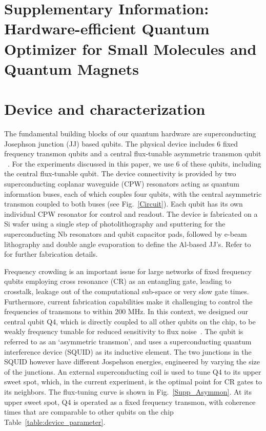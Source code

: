\documentclass[twocolumn]{revtex4-1}
\newcommand{\1}{\mathbbm{1}}
\newcommand{\beginsupplement}{%
        \setcounter{table}{0}
        \renewcommand{\thetable}{S\arabic{table}}%
        \setcounter{figure}{0}
        \renewcommand{\thefigure}{S\arabic{figure}}%
     }
\begin{document}
\pagebreak

\onecolumngrid




\section*{ Supplementary Information: Hardware-efficient Quantum Optimizer for Small Molecules and Quantum Magnets}
\beginsupplement





\section{Device and characterization}



The fundamental building blocks of our quantum hardware are superconducting Josephson junction (JJ) based qubits. The physical device includes 6 fixed frequency transmon qubits and a central flux-tunable asymmetric transmon qubit ~\cite{hutchings2017tunableS}. For the experiments discussed in this paper, we use 6 of these qubits, including the central flux-tunable qubit. The device connectivity is provided by two superconducting coplanar waveguide (CPW) resonators acting as quantum information buses, each of which couples four qubits, with the central asymmetric transmon coupled to both buses (see Fig.~\ref{Circuit}). Each qubit has its own individual CPW resonator for control and readout. The device is fabricated on a Si wafer using a single step of photolithography and sputtering for the superconducting Nb resonators and qubit capacitor pads, followed by e-beam lithography and double angle evaporation to define the Al-based JJ's. Refer to ~\cite{Chow2014S,Corcoles2015S} for further fabrication details.

Frequency crowding is an important issue for large networks of fixed frequency qubits employing cross resonance (CR) as an entangling gate, leading to crosstalk, leakage out of the computational sub-space or very slow gate times. Furthermore, current fabrication capabilities make it challenging to control the frequencies of transmons to within 200 MHz. In this context, we designed our central qubit Q4, which is directly coupled to all other qubits on the chip, to be weakly frequency tunable for reduced sensitivity to flux noise~\cite{hutchings2017tunableS}. The qubit is referred to as an `asymmetric transmon', and uses a superconducting quantum interference device (SQUID) as its inductive element. The two junctions in the SQUID however have different Jospehson energies, engineered by varying the size of the junctions. An external superconducting coil is used to tune Q4 to its upper sweet spot, which, in the current experiment, is the optimal point for CR gates to its neighbors. The flux-tuning curve is shown in Fig.~\ref{Supp_Asymmon}. At its upper sweet spot, Q4 is operated as a fixed frequency transmon, with coherence times that are comparable to other qubits on the chip Table~\ref{table:device_parameter}.
\end{document}
